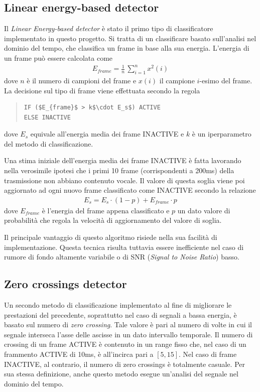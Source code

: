 \documentclass[10pt,twocolumn]{article}
\begin{document}
{\subsection{Linear energy-based detector}
\label{sect:led}
{Il \textit{Linear Energy-based detector} è stato il primo tipo di classificatore implementato in questo progetto. Si tratta di un classificare basato sull'analisi nel dominio del tempo, che classifica un frame in base alla sua energia. L'energia di un frame può essere calcolata come}
\begin{align*}
E_{frame} = \frac{1}{n} \, \sum_{i=1}^{n} x^2(i)
\end{align*}
dove $n$ è il numero di campioni del frame e $x(i)$ il campione $i$-esimo del frame. La decisione sul tipo di frame viene effettuata secondo la regola
\begin{quote}
\begin{lstlisting}
IF ($E_{frame}$ > k$\cdot E_s$) ACTIVE
ELSE INACTIVE
\end{lstlisting}
\end{quote}
\vspace{-0.2cm}
dove $E_s$ equivale all'energia media dei frame INACTIVE e $k$ è un iperparametro del metodo di classificazione.

\vspace{0.1cm}
Una stima iniziale dell'energia media dei frame INACTIVE è fatta lavorando nella verosimile ipotesi che i primi
10 frame (corrispondenti a 200ms) della trasmissione non abbiano contenuto vocale. Il valore di questa soglia
viene poi aggiornato ad ogni nuovo frame classificato come INACTIVE secondo la relazione
\begin{align}
E_s = E_s \cdot (1-p) + E_{frame} \cdot p
\label{eq:upd}
\end{align}
dove $E_{frame}$ è l'energia del frame appena classificato e $p$ un dato valore di probabilità che regola la
velocità di aggiornamento del valore di soglia.

Il principale vantaggio di questo algoritmo risiede nella sua facilità di implementazione. Questa tecnica
risulta tuttavia essere inefficiente nel caso di rumore di fondo altamente variabile o di SNR 
(\textit{Signal to Noise Ratio}) basso. 
\pagebreak

\subsection{Zero crossings detector}
Un secondo metodo di classificazione implementato al fine di migliorare le prestazioni del
precedente, soprattutto nel caso di segnali a bassa energia, è basato sul numero di 
\textit{zero crossing}. Tale valore è pari al numero di volte in cui il segnale interseca
l'asse delle ascisse in un dato intervallo temporale. Il numero di crossing di un frame ACTIVE è contenuto
in un range fisso che, nel caso di un frammento ACTIVE di 10ms, è all'incirca pari a $[5,15]$. 
Nel caso di frame INACTIVE, al contrario, il numero di zero crossings è totalmente casuale. 
Per sua stessa definizione, anche questo metodo esegue un'analisi del segnale nel dominio del tempo.

}
\end{document}
